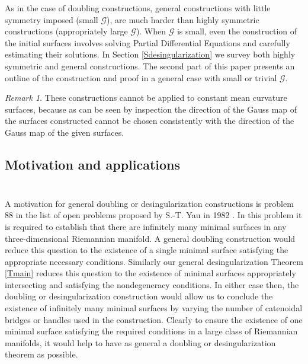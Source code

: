 \documentclass[12pt,namelimits,sumlimits]{amsart}
\theoremstyle{remark}
\newtheorem{remark}[theorem]{Remark}
\numberwithin{equation}{section}
\begin{document}
As in the case of doubling constructions,
general constructions with little symmetry imposed (small ${{\mathscr{G}}}$),
are much harder than highly symmetric constructions (appropriately large ${{\mathscr{G}}}$).
When ${{\mathscr{G}}}$ is small,
even the construction of the initial surfaces
involves solving Partial Differential Equations
and carefully estimating their solutions.
In Section \ref{Sdesingularization} we survey both highly symmetric and general constructions.
The second part of this paper presents
an outline of the construction and proof in a general case with small or trivial ${{\mathscr{G}}}$.

\addtocounter{equation}{1}
\begin{remark}
\label{Rcmc}
These constructions cannot be applied to constant mean curvature surfaces,
because as can be seen by inspection
the direction of the Gauss map of the surfaces constructed
cannot be chosen consistently with the direction of the Gauss map of the given surfaces.
\end{remark}

\subsection*{Motivation and applications}
$\phantom{ab}$
\nopagebreak

A motivation for general doubling or desingularization constructions is problem 88
in the list of open problems proposed by S.-T. Yau in 1982 \cite{yau:seminar}.
In this problem it is required to establish that there are infinitely many minimal
surfaces in any three-dimensional Riemannian manifold.
A general doubling construction would reduce this question to the existence of a single
minimal surface satisfying the appropriate necessary conditions.
Similarly our general desingularization Theorem \ref{Tmain} \cite{kapouleas:compact}
reduces this question to the existence of minimal surfaces appropriately intersecting
and satisfying the nondegeneracy conditions.
In either case then,
the doubling or desingularization construction would allow us to
conclude the existence of infinitely many minimal surfaces
by varying the number of catenoidal bridges or handles used in the construction.
Clearly to ensure the existence of one minimal surface satisfying the required conditions
in a large class of Riemannian manifolds,
it would help to have as general a doubling or desingularization theorem as possible.
\end{document}
